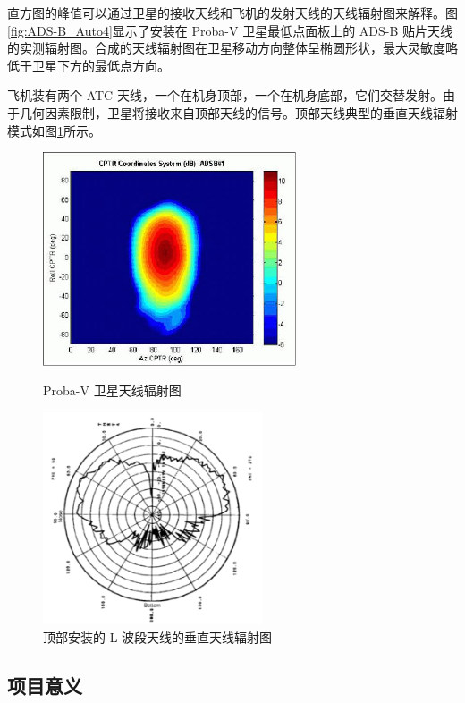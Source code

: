 直方图的峰值可以通过卫星的接收天线和飞机的发射天线的天线辐射图来解释。图\ref{fig:ADS-B_Auto4}显示了安装在 Proba-V 卫星最低点面板上的 ADS-B 贴片天线的实测辐射图。合成的天线辐射图在卫星移动方向整体呈椭圆形状，最大灵敏度略低于卫星下方的最低点方向。

飞机装有两个 ATC 天线，一个在机身顶部，一个在机身底部，它们交替发射。由于几何因素限制，卫星将接收来自顶部天线的信号。顶部天线典型的垂直天线辐射模式如图\ref{fig:antenna_of_plane}所示。

\begin{figure}[!htb]
\centering
\begin{minipage}[t]{0.48\textwidth}
\centering
\includegraphics[width=7.5cm]{pic/ADS-B_Auto4.jpeg}
\caption{Proba-V 卫星天线辐射图}
\label{fig:ADS-B_Auto4}
\end{minipage}
\begin{minipage}[t]{0.48\textwidth}
\centering
\includegraphics[width=6.5cm]{pic/antenna_of_plane.png}
\caption{顶部安装的 L 波段天线的垂直天线辐射图}
\label{fig:antenna_of_plane}
\end{minipage}
\end{figure}

\subsection{项目意义}

